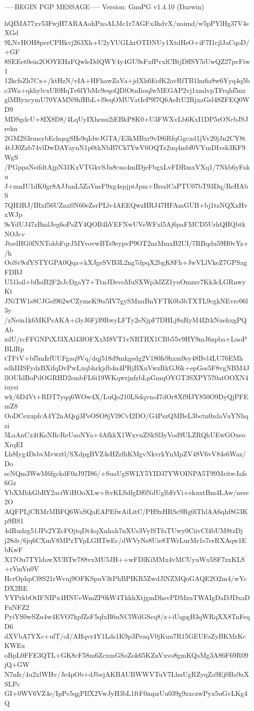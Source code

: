 -----BEGIN PGP MESSAGE-----
Version: GnuPG v1.4.10 (Darwin)

hQIMA77xv53FwjH7ARAAohPxoALMc1r7AGFx3hdvX/uaimd/w5pPYlHg37V4sXGd
9LNvHOH8perCPHkvj263Xh+U2yYUGLkrOTDNUy1XtdHeO+iF7I1cjlJaCqoD/+GF
8SEEet0ein2OOYEHzFQwleDdQWY4y4GU9sFxfPvxlCBtjDffSY5iUwQZ27pvFiw1
12kcfsZh7Cx+/ktHzN/vIA+HFhawZaVa+jdXh6EofK2avRfTB1lm6a8w6Yyq4q5b
c3Wa+qkhylvxUI0HqTv6lYbMc9eqoQDlOtnIioqlwMEGAP2vj1xmlvpTFrqhf5nx
glMByxcymU70YAMN9hfHbL+l9eqOMUVatIeP9l7Q6AeItU2RjxaGsl48ZFEQ0WD9
MDSgdcU+8IX8D8/4LqUyIXhenu2iEBkP8K0+U3FWXvLb6KxI1DP5rONcbJSJrekn
2GM2S3rmsybEchqsgSHs9qIdwJGTA/E3kMBxr9vI86RfqGgcxd1jVv20jJn2CY8t
4tJJ0Zzb74vlDwDAYaynN1p0tkNbB7Ck7YwV6OQTz2uq4mbf0VYmDIvsk3KF9WgS
/PGppaNsifdtAjpN31KxVTGkvSJn8cno4mIDjeFbgxLvFDRmxVXq1/7Nkb6yFaku
J+mnIU1dK0gr8AJJanL5ZaVnsF9xg4spjptJpm+BrszlCaPTU07bT93Dq/ReHAbS
7QH3RJ/IRxf56UZnx0N60eZsrPLlv4AEEQwzHRJ47HFAmGUB+bj1tzNQXxHvxWJp
9sYdUJ47zBmlJeg6oPsZY4QOB4hVEFNwUVeWFxl5Aj6paFMCD5UrhQHQbtkNOJcv
JtselHG0fNNTohbFqrJMYvovwBTs9eypvP9OT2nzMmxB2UI/7RBqdu59H0vYz+/h
OoSv9ofYSTYGPA0Qqa+kXJgeSVB3L2ng7dpqX2bgK8Fh+JwVLlVkeZ7GPSagFDBJ
U51loil+bfIsiB2F2sJcDgaY7+TtnJDsvoMuSXWp3dZZ1yuOmmv7Kk3cLGRnwyKt
JNiTW1s8CJGel962wCZymeK9ts5IV7gySMnuBnYFTK0b3bTXTL9cgkNEvrc06l3y
/zNein1k6MKPsAKA+i3yJ6Fj39RwyLFTy2eNjpF7DHLj8uRyM4I2tkNuehxgPQAb
zdU/rcFFGNPiXJ3XAl43fOFXxM8VT1vNRTHX1CBb55v9HY9mJ6zpba+LuoPBLlRp
tTFtV+bf5mIrfUUFgaq9Vq/dqj518d9mkgedg2V180fs9hxm9sy48Bvl4LU76EMh
sdhIIISFydzBXifqDvPwLxqbhrkjdb4n4PRjBXuVwzRkGJ6k+epGes5F8vgNBM4J
llOUIdBoPdOGRHD2embFL6i19WKqwrjnfzbLpGmqOYGT3SXPY570atOOXN4iuysi
wk/6D4Vt+RDT7yqq6WOw4X/LuQo210LSdqvnoI7dOr8Xf9IJY850O9DyQjPFEmZ8
OoDCexupfcA4Y2nAQqj3PeOSO8jVl9CvI2DO/G4PszQMBeL3bctn0zdaVuYNhqzi
5LaAnCx4tKsNRcReUaoNYa+4AfkkX1WxvnZSkSl3yVod9ULZRQhUEwGOxeoXrqEI
Lh8Iyg4DsbvMvwztl/SXdpgBVZ4sHZrfhKMgvNkvrkYnMpZV48V6vV84s6Waz/Do
scNQm3WwM6fgckdF0zJ97I86/+SuaUgSWLY5YID37YWOINPA5T99MritwJafs6Gz
YbXMbkGbRY2aciWiHOoXLw+ftvKLSdfgDf0NdUglbFrVi+ekuxtBm4LAw/nrse2O
AQFPLjCRMrMBFQ6WaSQaEAPEfwAiLitC/PH9xHRSc9Rg0lThlAA6qhf8G3Kp9BS1
4dRudzg51JPs2YZcFOjtqDt4ojXnhah7nXUs3VylSTfaTUwy0CiivCf4bUM8tzDj
j28dr/6jq6CXmV8MPzTYpLGHTwEc/dWVyNs8Uie8TWrLurMr1e7erRXAqw1EbKwF
X17Ou7TYldawXUBTw788vxMU5JH++wFDlKiMMx4vMCUyuWx5SF7zxKLS+rVmVn0V
HcrOphpCf8S21rWvnj9OFKSpuV3tPhBPIKR5ZwdJlNZMQoGAQE2O2m4/wYcDX2RE
YYPrkbOtIFNIPx4HNUeWmZP0kW4TkkhXtjgmDhsvPDMzuTWAIgDaDJDxaDFuNFZ2
PyiYS0wSZu4w4EVO7kpfZsF5qfxB6uNClWdGScq8/z+iUqpgB3qWRqXX8TnFeqD6
dXVbA7YXc+ufT/oI/AHqvr4Y1Lds1K9p3PeaqV0jKuu7R15GEUFaZyBKMrKcKWEx
oBpL0FFE3QTL+GK8cF58m6ZcxmGSoZok65KZnVxvo8gmKQaMg3A86F69R09jQ+GW
N7nIr/4u2xlWHv/Je4pOb+dJbejAKBAUBWWVTuV7LhuUgRZyqZa9Ej0Ba9aXSLPc
GI+0WV6VZ4e/IpPc5qgPIfX2VwJyH3bL1ftF0mpzUu039g9zxczwPyx5uGvLKg4Q

